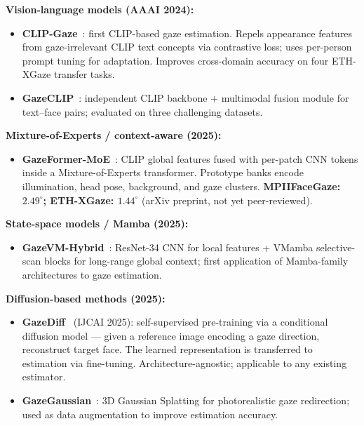 \documentclass[11pt,a4paper]{article}
\begin{document}
\textbf{Vision-language models (AAAI 2024):}
\begin{itemize}
  \item \textbf{CLIP-Gaze}~\cite{clipgaze2024}: first CLIP-based gaze estimation.
        Repels appearance features from gaze-irrelevant CLIP text concepts via contrastive loss;
        uses per-person prompt tuning for adaptation.
        Improves cross-domain accuracy on four ETH-XGaze transfer tasks.
  \item \textbf{GazeCLIP}~\cite{gazeclip2024}: independent CLIP backbone + multimodal
        fusion module for text--face pairs; evaluated on three challenging datasets.
\end{itemize}

\textbf{Mixture-of-Experts / context-aware (2025):}
\begin{itemize}
  \item \textbf{GazeFormer-MoE}~\cite{gazeformermoe2025}: CLIP global features fused with
        per-patch CNN tokens inside a Mixture-of-Experts transformer.
        Prototype banks encode illumination, head pose, background, and gaze clusters.
        \textbf{MPIIFaceGaze: $2.49^\circ$; ETH-XGaze: $1.44^\circ$} (arXiv preprint,
        not yet peer-reviewed).
\end{itemize}

\textbf{State-space models / Mamba (2025):}
\begin{itemize}
  \item \textbf{GazeVM-Hybrid}~\cite{gazevm2025}: ResNet-34 CNN for local features +
        VMamba selective-scan blocks for long-range global context;
        first application of Mamba-family architectures to gaze estimation.
\end{itemize}

\textbf{Diffusion-based methods (2025):}
\begin{itemize}
  \item \textbf{GazeDiff}~\cite{gazediff2025} (IJCAI 2025): self-supervised pre-training
        via a conditional diffusion model ---
        given a reference image encoding a gaze direction, reconstruct target face.
        The learned representation is transferred to estimation via fine-tuning.
        Architecture-agnostic; applicable to any existing estimator.
  \item \textbf{GazeGaussian}~\cite{gazegaussian2024}: 3D Gaussian Splatting for photorealistic
        gaze redirection; used as data augmentation to improve estimation accuracy.
\end{itemize}
\end{document}
